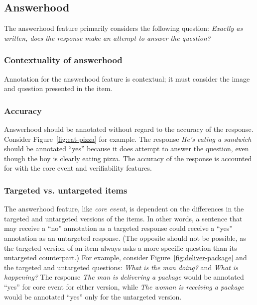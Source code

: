 \documentclass[12pt,notitlepage]{article}
\begin{document}
\subsection{Answerhood} \label{subsec:answerhood}

The answerhood feature primarily considers the following question: \textit{Exactly as written, does the response make an attempt to answer the question?}

\subsubsection{Contextuality of answerhood} Annotation for the answerhood feature is contextual; it must consider the image and question presented in the item.

\subsubsection{Accuracy} Answerhood should be annotated without regard to the accuracy of the response. Consider Figure~\ref{fig:eat-pizza} for example. The response \textit{He's eating a sandwich} should be annotated ``yes'' because it does attempt to answer the question, even though the boy is clearly eating pizza. The accuracy of the response is accounted for with the core event and verifiability features.

\subsubsection{Targeted vs. untargeted items} The answerhood feature, like \textit{core event}, is dependent on the differences in the targeted and untargeted versions of the items. In other words, a sentence that may receive a ``no'' annotation as a targeted response could receive a ``yes'' annotation as an untargeted response. (The opposite should not be possible, as the targeted version of an item always asks a more specific question than its untargeted counterpart.) For example, consider Figure~\ref{fig:deliver-package} and the targeted and untargeted questions: \textit{What is the man doing?} and \textit{What is happening?} The response \textit{The man is delivering a package} would be annotated ``yes'' for core event for either version, while \textit{The woman is receiving a package} would be annotated ``yes'' only for the untargeted version.
\end{document}
